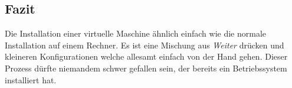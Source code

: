 \subsection{Fazit}
Die Installation einer virtuelle Maschine ähnlich einfach wie die normale Installation auf einem Rechner. Es ist eine Mischung aus \textit{Weiter} drücken und kleineren Konfigurationen welche allesamt einfach von der Hand gehen. Dieser Prozess dürfte niemandem schwer gefallen sein, der bereits ein Betriebssystem installiert hat.